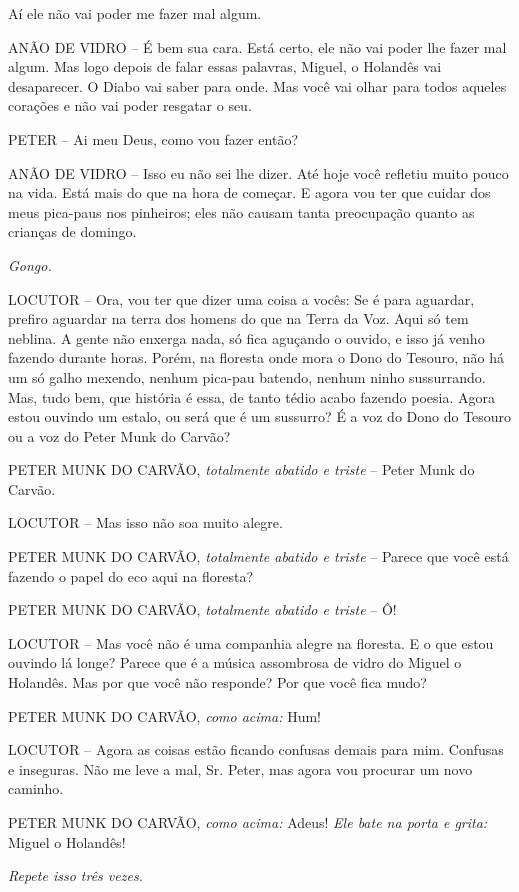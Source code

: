 Aí ele não vai poder me fazer mal algum.

ANÃO DE VIDRO -- É bem sua cara. Está certo, ele não vai poder lhe fazer
mal algum. Mas logo depois de falar essas palavras, Miguel, o Holandês
vai desaparecer. O Diabo vai saber para onde. Mas você vai olhar para
todos aqueles corações e não vai poder resgatar o seu.

PETER -- Ai meu Deus, como vou fazer então?

ANÃO DE VIDRO -- Isso eu não sei lhe dizer. Até hoje você refletiu muito
pouco na vida. Está mais do que na hora de começar. E agora vou ter que
cuidar dos meus pica-paus nos pinheiros; eles não causam tanta
preocupação quanto as crianças de domingo.

\emph{Gongo.}

LOCUTOR -- Ora, vou ter que dizer uma coisa a vocês: Se é para aguardar,
prefiro aguardar na terra dos homens do que na Terra da Voz. Aqui só tem
neblina. A gente não enxerga nada, só fica aguçando o ouvido, e isso já
venho fazendo durante horas. Porém, na floresta onde mora o Dono do
Tesouro, não há um só galho mexendo, nenhum pica-pau batendo, nenhum
ninho sussurrando. Mas, tudo bem, que história é essa, de tanto tédio
acabo fazendo poesia. Agora estou ouvindo um estalo, ou será que é um
sussurro? É a voz do Dono do Tesouro ou a voz do Peter Munk do Carvão?

PETER MUNK DO CARVÃO, \emph{totalmente abatido e triste} -- Peter Munk
do Carvão.

LOCUTOR -- Mas isso não soa muito alegre.

PETER MUNK DO CARVÃO, \emph{totalmente abatido e triste} -- Parece que
você está fazendo o papel do eco aqui na floresta?

PETER MUNK DO CARVÃO, \emph{totalmente abatido e triste} -- Ô!

LOCUTOR -- Mas você não é uma companhia alegre na floresta. E o que
estou ouvindo lá longe? Parece que é a música assombrosa de vidro do
Miguel o Holandês. Mas por que você não responde? Por que você fica
mudo?

PETER MUNK DO CARVÃO, \emph{como acima:} Hum!

LOCUTOR -- Agora as coisas estão ficando confusas demais para mim.
Confusas e inseguras. Não me leve a mal, Sr. Peter, mas agora vou
procurar um novo caminho.

PETER MUNK DO CARVÃO, \emph{como acima:} Adeus! \emph{Ele bate na porta
e grita:} Miguel o Holandês!

\emph{Repete isso três vezes.}

